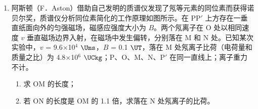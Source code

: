 \documentclass[\gkver]{gaokaozhenti}
\begin{document}
\begin{enumerate}
{根据电容的定义式  $C=\frac{Q}{U}$ 得此时电容器所带电荷量的最大值为

 $Q_{m}=CU_{m}=4.7\times10^{-6}\times3.75C\approx1.8\times10^{-5}C$
}

\item
阿斯顿（F．Aston）借助自己发明的质谱仪发现了氖等元素的同位素而获得诺贝尔奖，质谱仪分析同位素简化的工作原理如图所示。在 PP$'$ 上方存在一垂直纸面向外的匀强磁场，磁感应强度大小为 $B$。两个氖离子在 O 处以相同速度 $v$ 垂直磁场边界入射，在磁场中发生偏转，分别落在 M 和 N 处。已知某次实验中，$v$ = 9.6$\times$10$^{4}$ $\Ums$，$B$ = 0.1 $\UT$，落在 M 处氖离子比荷（电荷量和质量之比）为 4.8$\times$10$^{6}$ $\UCkg$；P、O、M、N、P$'$ 在同一直线上；离子重力不计。
\begin{enumerate}
	\item
	求 OM 的长度；
	\item
	若 ON 的长度是 OM 的 1.1 倍，求落在 N 处氖离子的比荷。
\end{enumerate}


\end{enumerate}
\end{document}
